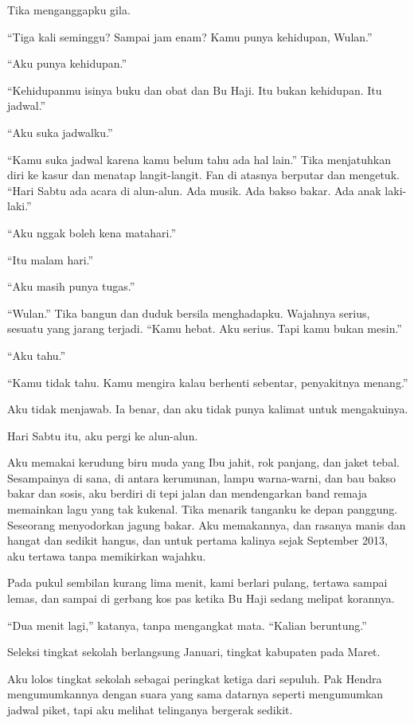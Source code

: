 \documentclass[11pt,twoside,openany]{book}
\makeatletter
\newcommand{\scenebreak}{\par\vspace{0.9em}{\centering\textsc{*\hspace{0.7em}*\hspace{0.7em}*}\par}\vspace{0.9em}\@afterindentfalse\@afterheading}
\makeatother
\begin{document}
\scenebreak
Tika menganggapku gila.

``Tiga kali seminggu? Sampai jam enam? Kamu punya kehidupan, Wulan.''

``Aku punya kehidupan.''

``Kehidupanmu isinya buku dan obat dan Bu Haji. Itu bukan kehidupan. Itu jadwal.''

``Aku suka jadwalku.''

``Kamu suka jadwal karena kamu belum tahu ada hal lain.'' Tika menjatuhkan diri ke kasur dan menatap langit-langit. Fan di atasnya berputar dan mengetuk. ``Hari Sabtu ada acara di alun-alun. Ada musik. Ada bakso bakar. Ada anak laki-laki.''

``Aku nggak boleh kena matahari.''

``Itu malam hari.''

``Aku masih punya tugas.''

``Wulan.'' Tika bangun dan duduk bersila menghadapku. Wajahnya serius, sesuatu yang jarang terjadi. ``Kamu hebat. Aku serius. Tapi kamu bukan mesin.''

``Aku tahu.''

``Kamu tidak tahu. Kamu mengira kalau berhenti sebentar, penyakitnya menang.''

Aku tidak menjawab. Ia benar, dan aku tidak punya kalimat untuk mengakuinya.

Hari Sabtu itu, aku pergi ke alun-alun.

Aku memakai kerudung biru muda yang Ibu jahit, rok panjang, dan jaket tebal. Sesampainya di sana, di antara kerumunan, lampu warna-warni, dan bau bakso bakar dan sosis, aku berdiri di tepi jalan dan mendengarkan band remaja memainkan lagu yang tak kukenal. Tika menarik tanganku ke depan panggung. Seseorang menyodorkan jagung bakar. Aku memakannya, dan rasanya manis dan hangat dan sedikit hangus, dan untuk pertama kalinya sejak September 2013, aku tertawa tanpa memikirkan wajahku.

Pada pukul sembilan kurang lima menit, kami berlari pulang, tertawa sampai lemas, dan sampai di gerbang kos pas ketika Bu Haji sedang melipat korannya.

``Dua menit lagi,'' katanya, tanpa mengangkat mata. ``Kalian beruntung.''

\scenebreak
Seleksi tingkat sekolah berlangsung Januari, tingkat kabupaten pada Maret.

Aku lolos tingkat sekolah sebagai peringkat ketiga dari sepuluh. Pak Hendra mengumumkannya dengan suara yang sama datarnya seperti mengumumkan jadwal piket, tapi aku melihat telinganya bergerak sedikit.
\end{document}
